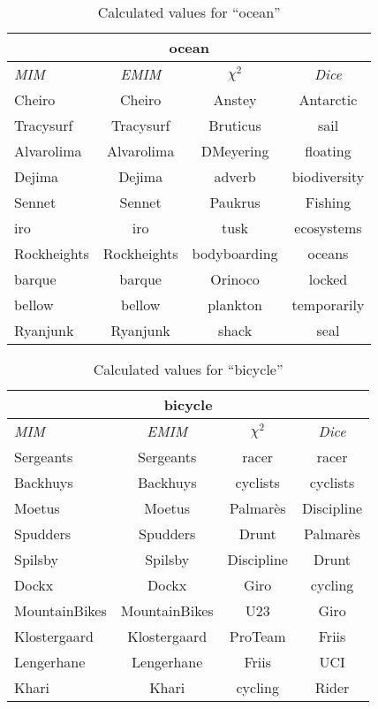 \begin{table}[h!]
\centering
\begin{tabular}{ l | c | c | c }
\hline
\multicolumn{4}{c}{ocean}\\
\hline
\textit{MIM} & \textit{EMIM} & \textit{\(\chi^2\)} & \textit{Dice}\\
\hline
Cheiro & Cheiro & Anstey & Antarctic\\
Tracysurf & Tracysurf & Bruticus & sail\\
Alvarolima & Alvarolima & DMeyering & floating\\
Dejima & Dejima & adverb & biodiversity\\
Sennet & Sennet & Paukrus & Fishing\\
iro & iro & tusk & ecosystems\\
Rockheights & Rockheights & bodyboarding & oceans\\
barque & barque & Orinoco & locked\\
bellow & bellow & plankton & temporarily\\
Ryanjunk & Ryanjunk & shack & seal\\
\hline
\end{tabular}
\caption{Calculated values for ``ocean''}
\label{tab:words}
\end{table}
\begin{table}[h!]
\centering
\begin{tabular}{ l | c | c | c }
\hline
\multicolumn{4}{c}{bicycle}\\
\hline
\textit{MIM} & \textit{EMIM} & \textit{\(\chi^2\)} & \textit{Dice}\\
\hline
Sergeants & Sergeants & racer & racer\\
Backhuys & Backhuys & cyclists & cyclists\\
Moetus & Moetus & Palmarès & Discipline\\
Spudders & Spudders & Drunt & Palmarès\\
Spilsby & Spilsby & Discipline & Drunt\\
Dockx & Dockx & Giro & cycling\\
MountainBikes & MountainBikes & U23 & Giro\\
Klostergaard & Klostergaard & ProTeam & Friis\\
Lengerhane & Lengerhane & Friis & UCI\\
Khari & Khari & cycling & Rider\\
\hline
\end{tabular}
\caption{Calculated values for ``bicycle''}
\label{tab:words}
\end{table}

